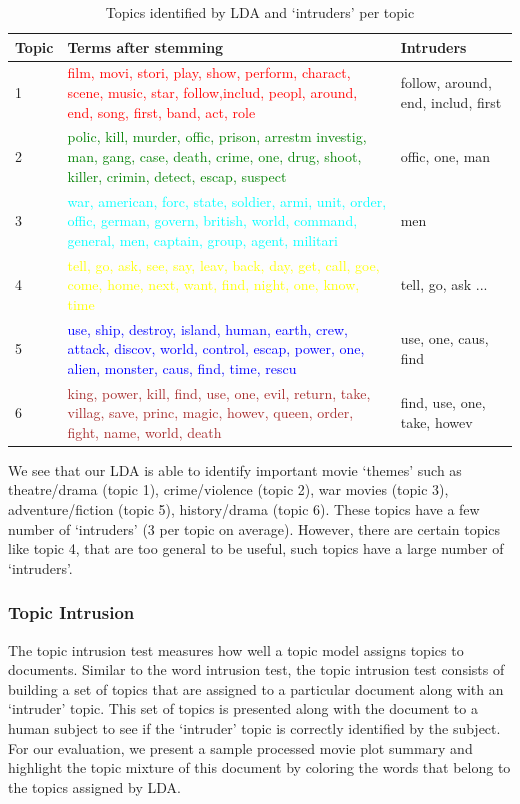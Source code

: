 \documentclass{article} %
\begin{document}
\begin{table}[h]
\label{table:word-intrusion}
\begin{center}
\begin{tabular}{l|p{3.5in}|p{1.2in}}
Topic	& Terms	after stemming & Intruders \\ \hline
1 & \textcolor{red}{film, movi, stori, play, show, perform, charact, scene, music, star, follow,includ, peopl, around, end, song, first, band, act, role} & follow, around, end, includ, first \\
2 & \textcolor{green}{polic, kill, murder, offic, prison, arrestm investig, man, gang, case, death, crime, one, drug, shoot, killer, crimin, detect, escap, suspect} & offic, one, man \\
3 & \textcolor{cyan}{war, american, forc, state, soldier, armi, unit, order, offic, german,
govern, british, world, command, general, men, captain, group, agent, militari} & men \\
4 & \textcolor{yellow}{tell, go, ask, see, say, leav, back, day, get, call, goe, come, home, next,
want, find, night, one, know, time} & tell, go, ask ... \\
5 & \textcolor{blue}{use, ship, destroy, island, human, earth, crew, attack, discov, world,
control, escap, power, one, alien, monster, caus, find, time, rescu} & use, one,
caus, find \\ 
6 & \textcolor{brown}{king, power, kill, find, use, one, evil, return, take, villag, save, princ, magic, howev, queen, order, fight, name, world, death} & find, use, one, take, howev \\ \hline 
\end{tabular}
\end{center}
\caption{Topics identified by LDA and `intruders' per topic}
\end{table}

We see that our LDA is able to identify important movie `themes' such as 
theatre/drama (topic 1), crime/violence (topic 2), war movies (topic 3), 
adventure/fiction (topic 5), history/drama (topic 6). 
These topics have a few number of `intruders' (3 per topic on average). 
However, there are certain topics like topic 4, that are too general to be 
useful, such topics have a large number of `intruders'.

\subsubsection{Topic Intrusion}
The topic intrusion test measures how well a topic model assigns topics to
documents. Similar to the word intrusion test, the topic intrusion test consists
of building a set of topics that are assigned to a particular document along 
with an `intruder' topic. This set of topics is presented along with the 
document
to a human subject to see if the `intruder' topic is correctly identified by the
subject. For our evaluation, we present a sample processed movie plot summary 
and highlight the topic mixture of this document by coloring the words that 
belong to the topics assigned by LDA. 
\end{document}
